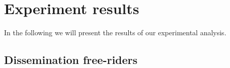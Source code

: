 


\section{Experiment results}
In the following we will present the results of our experimental analysis.
\subsection{Dissemination free-riders}

